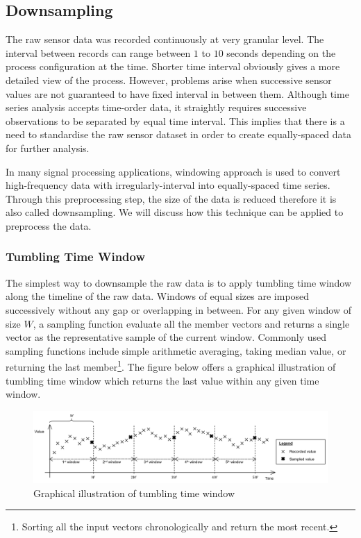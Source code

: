 \documentclass[11pt]{article} %
\theoremstyle{plain}
\theoremstyle{definition}
\begin{document}
\subsection{Downsampling}

The raw sensor data was recorded continuously at very granular level. The interval between records can range between \(1\) to \(10\) seconds depending on the process configuration at the time. Shorter time interval obviously gives a more detailed view of the process. However, problems arise when successive sensor values are not guaranteed to have fixed interval in between them. Although time series analysis accepts time-order data, it straightly requires successive observations to be separated by equal time interval. This implies that there is a need to standardise the raw sensor dataset in order to create equally-spaced data for further analysis.

In many signal processing applications, windowing approach is used to convert high-frequency data with irregularly-interval into equally-spaced time series. Through this preprocessing step, the size of the data is reduced therefore it is also called downsampling. We will discuss how this technique can be applied to preprocess the data.

\subsubsection{Tumbling Time Window}

The simplest way to downsample the raw data is to apply tumbling time window along the timeline of the raw data. Windows of equal sizes are imposed successively without any gap or overlapping in between. For any given window of size \(W\), a sampling function evaluate all the member vectors and returns a single vector as the representative sample of the current window. Commonly used sampling functions include simple arithmetic averaging, taking median value, or returning the last member\footnote{Sorting all the input vectors chronologically and return the most recent.}. The figure below offers a graphical illustration of tumbling time window which returns the last value within any given time window.

\begin{figure}[H]
	\centering
	\includegraphics[width=1\textwidth]{tumbling_time_window.PNG}
	\caption{Graphical illustration of tumbling time window}
	\label{fig:tumbling_time_window}
\end{figure}
\end{document}

